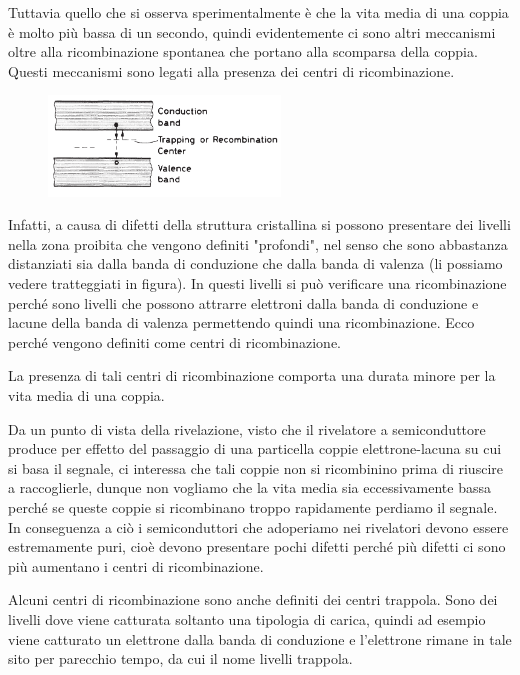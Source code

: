 Tuttavia quello che si osserva sperimentalmente è che la vita media di una coppia è molto più bassa di un secondo, quindi evidentemente ci sono altri meccanismi oltre alla ricombinazione spontanea che portano alla scomparsa della coppia. Questi meccanismi sono legati alla presenza dei centri di ricombinazione.

\begin{figure}[H]
   \centering
   \includegraphics[width=0.55\textwidth]{immagini/centri_di_ricombinazione.png}
\end{figure}

Infatti, a causa di difetti della struttura cristallina si possono presentare dei livelli nella zona proibita che vengono definiti "profondi", nel senso che sono abbastanza distanziati sia dalla banda di conduzione che dalla banda di valenza (li possiamo vedere tratteggiati in figura). In questi livelli si può verificare una ricombinazione perché sono livelli che possono attrarre elettroni dalla banda di conduzione e lacune della banda di valenza permettendo quindi una ricombinazione. Ecco perché vengono definiti come centri di ricombinazione.

La presenza di tali centri di ricombinazione comporta una durata minore per la vita media di una coppia.

\vspace{0.2cm}Da un punto di vista della rivelazione, visto che il rivelatore a semiconduttore produce per effetto del passaggio di una particella coppie elettrone-lacuna su cui si basa il segnale, ci interessa che tali coppie non si ricombinino prima di riuscire a raccoglierle, dunque non vogliamo che la vita media sia eccessivamente bassa perché se queste coppie si ricombinano troppo rapidamente perdiamo il segnale. In conseguenza a ciò i semiconduttori che adoperiamo nei rivelatori devono essere estremamente puri, cioè devono presentare pochi difetti perché più difetti ci sono più aumentano i centri di ricombinazione.

Alcuni centri di ricombinazione sono anche definiti dei centri trappola. Sono dei livelli dove viene catturata soltanto una tipologia di carica, quindi ad esempio viene catturato un elettrone dalla banda di conduzione e l'elettrone rimane in tale sito per parecchio tempo, da cui il nome livelli trappola.

